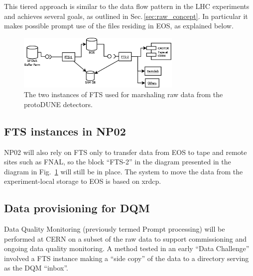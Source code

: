 \documentclass[12pt]{article}
\begin{document}
{This tiered approach is similar to the data flow pattern in the LHC experiments and achieves several goals,
as outlined in Sec.\,\ref{sec:raw_concept}. In particular
it makes possible prompt use of the files residing in EOS, as explained below.

\begin{figure}[tbh]
  \centering
  \includegraphics[width=0.7\textwidth]{figures/ftsinstances_v2.png}
  \caption{The two instances of FTS used for marshaling raw data from the protoDUNE detectors.}
  \label{fig:ftsinstances}
\end{figure}

\subsection{FTS instances in NP02}
NP02 will also rely on FTS only to transfer data from EOS to tape and remote sites such as FNAL,
so the block ``FTS-2'' in the diagram presented in the diagram in Fig.~\ref{fig:ftsinstances} will still be in place.
The system to move the data from the experiment-local storage to EOS is based on xrdcp.

\subsection{Data provisioning for DQM}
\label{sec:prompt}

Data Quality Monitoring (previously termed Prompt processing) will be performed at CERN on a subset of the raw
data to support commissioning and ongoing data quality monitoring.
A method tested in an early ``Data Challenge'' involved a FTS instance
making a ``side copy'' of the data to a directory serving as the DQM ``inbox''.



}
\end{document}
